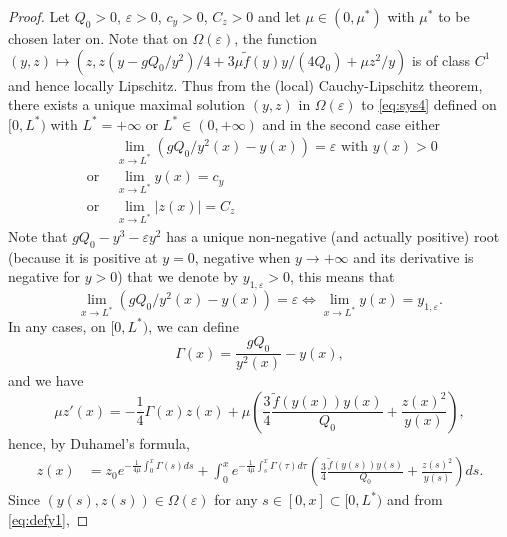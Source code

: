 \documentclass[11pt]{article}
\begin{document}
\begin{proof}
Let $Q_{0}>0$, $\varepsilon>0$, $c_{y}>0$, $C_{z}>0$ and let $\mu\in(0,\mu^{*})$ with $\mu^{*}$ to be chosen later on. {Note that on $\Omega(\varepsilon)$, the function $(y,z)\mapsto (z, z(y-gQ_{0}/y^{2})/4+3\mu\tilde{f}(y)y/(4Q_{0})+\mu z^{2}/y)$ is of class $C^{1}$ and hence locally Lipschitz. Thus from} the {(local)} Cauchy-Lipschitz theorem, 
there exists a unique maximal solution $(y, z)$ in $\Omega(\varepsilon)$ to \eqref{eq:sys4} defined 
on $[0,L^{*})$ with $L^{*}=+\infty$ or $L^{*}\in(0,+\infty)$ and in {the second} case either
\begin{equation}
\label{eq:boundslim}
\begin{split}
&\lim\limits_{x\rightarrow L^{*}}(gQ_{0}/y^{2}(x)-y(x)) =\varepsilon\text{ with }y(x)> 0\\
\text{ or }&\lim\limits_{x\rightarrow L^{*}}y(x) = c_{y}\\
\text{ or }&\lim\limits_{x\rightarrow L^{*}}|z(x)| = C_{z}
\end{split}
\end{equation}
Note that $gQ_{0}-y^{3}-\varepsilon y^{2}$ has a unique non-negative (and actually positive) root (because it is positive at $y=0$, negative when $y \to +\infty$ and its derivative is negative for $y > 0$) that we denote by $y_{1,\varepsilon}>0$, this means that 
\begin{equation}
\label{eq:defy1}
\lim\limits_{x\rightarrow L^{*}}(gQ_{0}/y^{2}(x)-y(x)) =\varepsilon \iff
   \lim\limits_{x\rightarrow L^{*}}y(x) = y_{1,\varepsilon}.
\end{equation}
In any cases, on $[0,L^{*})$, we can define 
\begin{equation}
\label{eq:defg}
{\Gamma(x)} =\frac{gQ_{0}}{y^{2}(x)}-y(x),
\end{equation}
and we have
\begin{equation}
    \mu z'(x) = -\frac{1}{4}{\Gamma(x)}z(x)+\mu\left(\frac{3}{4}\frac{\tilde{f}(y(x))y(x)}{Q_{0}}+\frac{z(x)^{2}}{y(x)}\right),
\end{equation}
hence, by Duhamel's formula,
\begin{equation}
\begin{split}
    z(x) &= z_{0} e^{-\frac{1}{4\mu}\int_{0}^{x}{\Gamma(s)}ds}+  \int_{0}^{x}e^{-\frac{1}{4\mu}\int_{s}^{x}{\Gamma(\tau)}d\tau}\left(\frac{3}{4}\frac{\tilde{f}(y(s))y(s)}{Q_{0}}+\frac{z(s)^{2}}{y(s)}\right) ds.
\end{split}
\end{equation}
Since $(y(s),z(s))\in \Omega(\varepsilon)$ for any $s\in [0,x]\subset[0,L^{*})$ and from \eqref{eq:defy1},

\end{proof}
\end{document}
